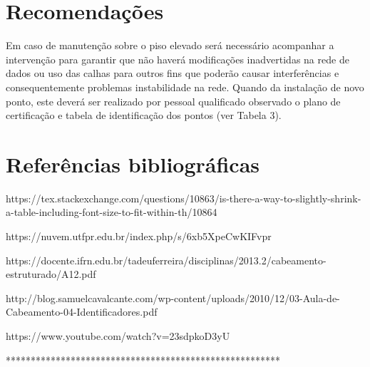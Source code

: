 \documentclass[	DIV=calc,%
							paper=a4,%
							fontsize=12pt,%
							onecolumn]{scrartcl}	 					%
\begin{document}
\section{Recomendações}
Em caso de manutenção sobre o piso elevado será necessário acompanhar a intervenção para garantir que não haverá modificações inadvertidas na rede de dados ou uso das calhas para outros fins que poderão causar interferências e consequentemente problemas instabilidade na rede.
Quando da instalação de novo ponto, este deverá ser realizado por pessoal qualificado observado o plano de certificação e tabela de identificação dos pontos (ver Tabela 3).

\section{Referências bibliográficas}
https://tex.stackexchange.com/questions/10863/is-there-a-way-to-slightly-shrink-a-table-including-font-size-to-fit-within-th/10864


https://nuvem.utfpr.edu.br/index.php/s/6xb5XpeCwKIFvpr


https://docente.ifrn.edu.br/tadeuferreira/disciplinas/2013.2/cabeamento-estruturado/A12.pdf


http://blog.samuelcavalcante.com/wp-content/uploads/2010/12/03-Aula-de-Cabeamento-04-Identificadores.pdf


https://www.youtube.com/watch?v=23sdpkoD3yU 

*******************************************************
\end{document}
